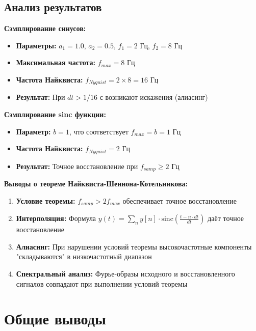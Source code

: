 \subsection*{Анализ результатов}

\textbf{Сэмплирование синусов:}
\begin{itemize}
    \item \textbf{Параметры:} $a_1 = 1.0$, $a_2 = 0.5$, $f_1 = 2$ Гц, $f_2 = 8$ Гц
    \item \textbf{Максимальная частота:} $f_{max} = 8$ Гц
    \item \textbf{Частота Найквиста:} $f_{Nyquist} = 2 \times 8 = 16$ Гц
    \item \textbf{Результат:} При $dt > 1/16$ с возникают искажения (алиасинг)
\end{itemize}

\textbf{Сэмплирование sinc функции:}
\begin{itemize}
    \item \textbf{Параметр:} $b = 1$, что соответствует $f_{max} = b = 1$ Гц
    \item \textbf{Частота Найквиста:} $f_{Nyquist} = 2$ Гц
    \item \textbf{Результат:} Точное восстановление при $f_{samp} \geq 2$ Гц
\end{itemize}

\textbf{Выводы о теореме Найквиста-Шеннона-Котельникова:}
\begin{enumerate}
    \item \textbf{Условие теоремы:} $f_{samp} > 2f_{max}$ обеспечивает точное восстановление
    \item \textbf{Интерполяция:} Формула $y(t) = \sum_n y[n] \cdot \text{sinc}\left(\frac{t - n \cdot dt}{dt}\right)$ даёт точное восстановление
    \item \textbf{Алиасинг:} При нарушении условий теоремы высокочастотные компоненты "складываются" в низкочастотный диапазон
    \item \textbf{Спектральный анализ:} Фурье-образы исходного и восстановленного сигналов совпадают при выполнении условий теоремы
\end{enumerate}

\section*{Общие выводы}

